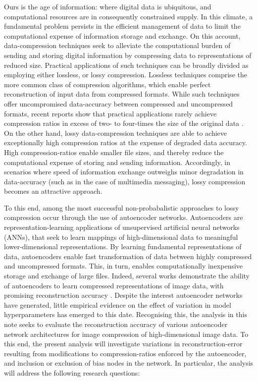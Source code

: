

\noindent
Ours is the age of information: where digital data is ubiquitous, and computational resources are in consequently constrained supply.
In this climate, a fundamental problem persists in the efficient management of data to limit the computational expense of information storage and exchange.
On this account, data-compression techniques seek to alleviate the computational burden of sending and storing digital information by compressing data to representations of reduced size.
Practical applications of such techniques can be broadly divided as employing either lossless, or lossy compression.
Lossless techniques comprise the more common class of compression algorithms, which enable perfect reconstruction of input data from compressed formats.
While such techniques offer uncompromised data-accuracy between compressed and uncompressed formats, recent reports show that practical applications rarely achieve compression ratios in excess of two- to four-times the size of the original data \cite{mittal2015survey}.
On the other hand, lossy data-compression techniques are able to achieve exceptionally high compression ratios at the expense of degraded data accuracy.
High compression-ratios enable smaller file sizes, and thereby reduce the computational expense of storing and sending information. 
Accordingly, in scenarios where speed of information exchange outweighs minor degradation in data-accuracy (such as in the case of multimedia messaging), lossy compression becomes an attractive approach. 

To this end, among the most successful non-probabalistic approaches to lossy compression occur through the use of autoencoder networks.
Autoencoders are representation-learning applications of unsupervised artificial neural networks (ANNs), that seek to learn mappings of high-dimensional data to meaningful lower-dimensional representations.
By learning fundamental representations of data, autoencoders enable fast transformation of data between highly compressed and uncompressed formats.
This, in turn, enables computationally inexpensive storage and exchange of large files.
Indeed, several works demonstrate the ability of autoencoders to learn compressed representations of image data, with promising reconstruction accuracy \cite{cheng2018deep, toderici2017full, balle2016end}.
Despite the interest autoencoder networks have generated, little  empirical evidence on the effect of variation in model hyperparameters has emerged to this date.
Recognising this, the analysis in this note seeks to evaluate the reconstruction accuracy of various autoencoder network architectures for image compression of high-dimensional image data. 
To this end, the present analysis will investigate variations in reconstruction-error resulting from modifications to compression-ratios enforced by the autoencoder, and inclusion or exclusion of bias nodes in the network. In particular, the analysis will address the following research questions:

